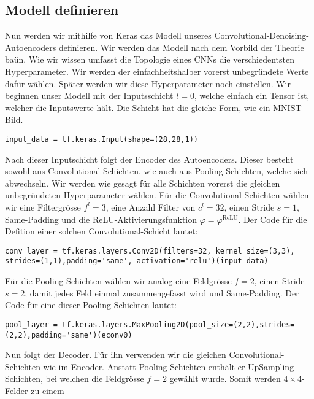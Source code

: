\subsection{Modell definieren}
Nun werden wir mithilfe von Keras das Modell unseres
Convolutional-Denoising-Autoencoders definieren.
Wir werden das Modell nach dem Vorbild der Theorie baün.
Wie wir wissen umfasst die Topologie eines CNNs die verschiedentsten
Hyperparameter. Wir werden der einfachheitshalber vorerst unbegründete Werte
dafür wählen. Später werden wir diese Hyperparameter noch einstellen.
\para{}
Wir beginnen unser Modell mit der Inputsschicht $l=0$, welche einfach ein Tensor
ist, welcher die Inputswerte hält. Die Schicht hat die gleiche Form, wie ein MNIST-Bild.
\begin{verbatim}
input_data = tf.keras.Input(shape=(28,28,1))
\end{verbatim}
\para{}
Nach dieser Inputschicht folgt der Encoder des Autoencoders. Dieser besteht
sowohl aus Convolutional-Schichten, wie auch aus Pooling-Schichten, welche sich abwechseln.
Wir werden wie gesagt für alle Schichten vorerst die gleichen unbegründeten
Hyperparameter wählen. Für die Convolutional-Schichten wählen wir
eine Filtergrösse $f^l = 3$, eine Anzahl Filter von $c^l = 32$,
einen Stride $s=1$, Same-Padding und die ReLU-Aktivierungsfunktion $\varphi = \varphi^{\text{ReLU}}$.
Der Code für die Defition einer solchen Convolutional-Schicht lautet:
\begin{verbatim}
conv_layer = tf.keras.layers.Conv2D(filters=32, kernel_size=(3,3),
strides=(1,1),padding='same', activation='relu')(input_data)
\end{verbatim}
Für die Pooling-Schichten wählen wir analog eine Feldgrösse $f = 2$, einen
Stride $s = 2$, damit jedes Feld einmal zusammengefasst wird und Same-Padding.
Der Code für eine dieser Pooling-Schichten lautet:
\begin{verbatim}
pool_layer = tf.keras.layers.MaxPooling2D(pool_size=(2,2),strides=(2,2),padding='same')(econv0)
\end{verbatim}
Nun folgt der Decoder.
Für ihn verwenden wir die gleichen Convolutional-Schichten wie im Encoder. Anstatt
Pooling-Schichten enthält er UpSampling-Schichten, bei welchen die
Feldgrösse $f = 2$ gewählt wurde. Somit werden $4 \times 4$-Felder zu einem
